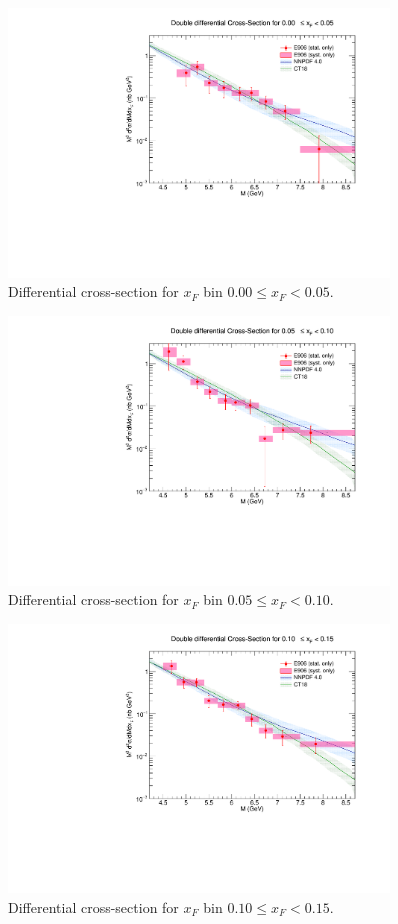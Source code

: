\documentclass[11pt]{article}
\begin{document}
\begin{figure}[p]
\centering
\includegraphics[width=0.9\textwidth]{./XSecPlots/LH2_0_roofit.pdf}
\caption{Differential cross-section for $x_F$ bin $0.00 \leq x_F < 0.05$.}
\end{figure}
\clearpage
\begin{figure}[p]
\centering
\includegraphics[width=0.9\textwidth]{./XSecPlots/LH2_1_roofit.pdf}
\caption{Differential cross-section for $x_F$ bin $0.05 \leq x_F < 0.10$.}
\end{figure}
\clearpage
\begin{figure}[p]
\centering
\includegraphics[width=0.9\textwidth]{./XSecPlots/LH2_2_roofit.pdf}
\caption{Differential cross-section for $x_F$ bin $0.10 \leq x_F < 0.15$.}
\end{figure}
\end{document}
